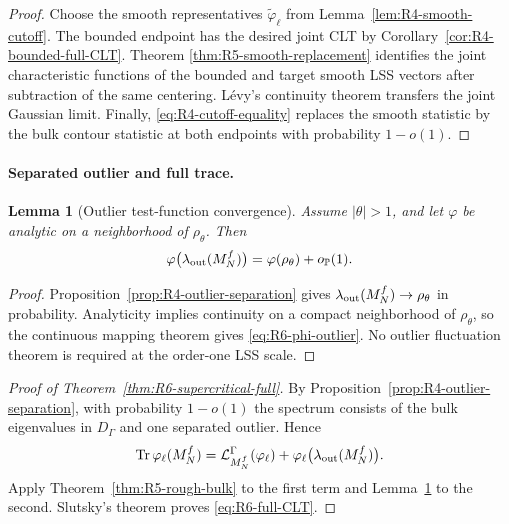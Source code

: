 \documentclass[11pt]{article}
\newtheorem{lemma}[theorem]{Lemma}
\theoremstyle{definition}
\theoremstyle{remark}
\newcommand{\Tr}{\operatorname{Tr}}
\begin{document}
\begin{proof}
Choose the smooth representatives
\(\widetilde\varphi_\ell\) from
Lemma~\ref{lem:R4-smooth-cutoff}.  The bounded endpoint has the desired joint
CLT by Corollary~\ref{cor:R4-bounded-full-CLT}.  Theorem
\ref{thm:R5-smooth-replacement} identifies the joint characteristic
functions of the bounded and target smooth LSS vectors after subtraction of
the same centering.  L\'evy's continuity theorem transfers the joint Gaussian
limit.  Finally, \eqref{eq:R4-cutoff-equality} replaces the smooth statistic
by the bulk contour statistic at both endpoints with probability \(1-o(1)\).
\end{proof}


\paragraph{Separated outlier and full trace.}
\label{sec:R6-package}

\begin{lemma}[Outlier test-function convergence]
\label{lem:R6-outlier-function}
Assume \(|\theta|>1\), and let \(\varphi\) be analytic on a neighborhood of
\(\rho_\theta\).  Then
\begin{equation}\label{eq:R6-phi-outlier}
 \varphi\bigl(\lambda_{\rm out}(M_N^f)\bigr)
 =\varphi(\rho_\theta)+o_{\mathbb P}(1).
\end{equation}
\end{lemma}

\begin{proof}
Proposition~\ref{prop:R4-outlier-separation} gives
\(\lambda_{\rm out}(M_N^f)\to\rho_\theta\) in probability.  Analyticity implies
continuity on a compact neighborhood of \(\rho_\theta\), so the continuous
mapping theorem gives \eqref{eq:R6-phi-outlier}.  No outlier fluctuation
theorem is required at the order-one LSS scale.
\end{proof}

\begin{proof}[Proof of Theorem~\ref{thm:R6-supercritical-full}]

By Proposition~\ref{prop:R4-outlier-separation}, with probability \(1-o(1)\)
the spectrum consists of the bulk eigenvalues in \(D_\Gamma\) and one
separated outlier.  Hence
\[
 \Tr\varphi_\ell(M_N^f)
 =
 \mathcal L_{M_N^f}^\Gamma(\varphi_\ell)
 +\varphi_\ell\bigl(\lambda_{\rm out}(M_N^f)\bigr).
\]
Apply Theorem~\ref{thm:R5-rough-bulk} to the first term and
Lemma~\ref{lem:R6-outlier-function} to the second.  Slutsky's theorem proves
\eqref{eq:R6-full-CLT}.
\end{proof}
\end{document}
